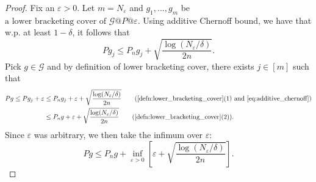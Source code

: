 \documentclass[twoside]{article}
\begin{document}
\begin{proof}
   Fix an $\varepsilon>0$. Let $m=N_\varepsilon$ and $g_1,...,g_m$ be $\text{a lower bracketing cover of }\mathcal G\text{@}P\text{@}\varepsilon$. Using additive Chernoff bound, we have that w.p. at least $1-\delta$, it follows that
   \begin{equation}
      Pg_j\le P_ng_j+\sqrt{\frac{\log(N_\varepsilon/\delta)}{2n}}\label{eq:additive_chernoff}. 
   \end{equation}
   Pick $g\in \mathcal G$ and by definition of lower bracketing cover, there exists $j\in [m]$ such that
   \begin{align*}
      Pg\le Pg_j+\varepsilon&\le P_ng_j + \varepsilon + \sqrt{\frac{\log(N_\varepsilon/\delta)}{2n}}\tag{\cref{defn:lower_bracketing_cover}(1) and \cref{eq:additive_chernoff}}\\
      &\le P_ng+\varepsilon+\sqrt{\frac{\log(N_\varepsilon/\delta)}{2n}}\tag{\cref{defn:lower_bracketing_cover}(2)}.
   \end{align*}
   Since $\varepsilon$ was arbitrary, we then take the infimum over $\varepsilon$:
   \begin{equation*}
      Pg\le P_ng+\inf_{\varepsilon>0}\left[\varepsilon+\sqrt{\frac{\log(N_\varepsilon/\delta)}{2n}}\right].
   \end{equation*}
\end{proof}

% 
\end{document}
